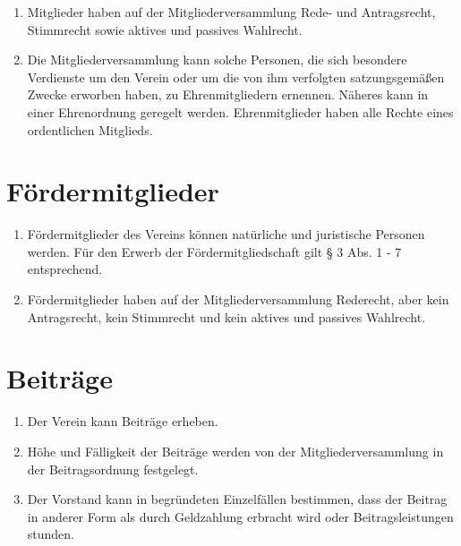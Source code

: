 \documentclass[10pt,conference,a4paper,nofonttune]{IEEEtran}
\begin{document}
\begin{enumerate}
  \item Mitglieder haben auf der Mitgliederversammlung Rede- und Antragsrecht,
    Stimmrecht sowie aktives und passives Wahlrecht.

  \item Die Mitgliederversammlung kann solche Personen, die sich besondere
    Verdienste um den Verein oder um die von ihm verfolgten satzungsgemäßen
    Zwecke erworben haben, zu Ehrenmitgliedern ernennen. Näheres kann in einer
    Ehrenordnung geregelt werden. Ehrenmitglieder haben alle Rechte eines
    ordentlichen Mitglieds.
\end{enumerate}


\section{Fördermitglieder}
\begin{enumerate}
  \item Fördermitglieder des Vereins können natürliche und juristische Personen
    werden. Für den Erwerb der Fördermitgliedschaft gilt § 3 Abs. 1 - 7
    entsprechend.

  \item Fördermitglieder haben auf der Mitgliederversammlung Rederecht, aber
    kein Antragsrecht, kein Stimmrecht und kein aktives und passives Wahlrecht.
\end{enumerate}


\section{Beiträge}
\begin{enumerate}
  \item Der Verein kann Beiträge erheben.

  \item Höhe und Fälligkeit der Beiträge werden von der Mitgliederversammlung in
    der Beitragsordnung festgelegt.

  \item Der Vorstand kann in begründeten Einzelfällen bestimmen, dass der
    Beitrag in anderer Form als durch Geldzahlung erbracht wird oder
    Beitragsleistungen stunden.
\end{enumerate}
\end{document}
